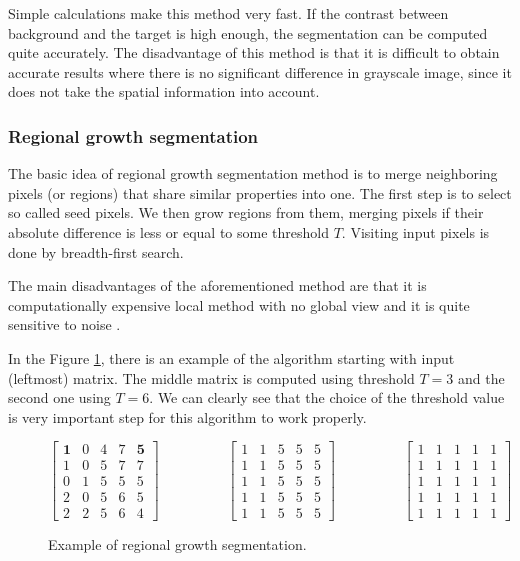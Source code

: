 Simple calculations make this method very fast. If the contrast between
background and the target is high enough, the segmentation can be computed quite
accurately. The disadvantage of this method is that it is difficult to obtain
accurate results where there is no significant difference in grayscale image, since
it does not take the spatial information into account. \cite{bib:yuheng2017image}

\subsubsection{Regional growth segmentation}
\label{sec:image_segmentation:region_based:reggrowth}

The basic idea of regional growth segmentation method is to merge neighboring
pixels (or regions) that share similar properties into one. The first step
is to select so called seed pixels. We then grow regions from them, merging pixels
if their absolute difference is less or equal to some threshold $T$.
Visiting input pixels is done by breadth-first search.

The main disadvantages of the aforementioned method are that it is computationally expensive
local method with no global view and it is quite sensitive to noise .

In the Figure \ref{img:regionalgrowthexample},
there is an example of the algorithm starting with input (leftmost) matrix. The middle
matrix is computed using threshold $T=3$ and the second one using $T=6$. We can clearly
see that the choice of the threshold value is very important step for this algorithm
to work properly. \cite{bib:yuheng2017image}

\begin{figure}[!h]
    $$\begin{bmatrix}
    \textbf{1} & 0 & 4 & 7 & \textbf{5} \\
    1 & 0 & 5 & 7 & 7 \\
    0 & 1 & 5 & 5 & 5 \\
    2 & 0 & 5 & 6 & 5 \\
    2 & 2 & 5 & 6 & 4
    \end{bmatrix}
    \hspace{2cm}
    \begin{bmatrix}
    1 & 1 & 5 & 5 & 5 \\
    1 & 1 & 5 & 5 & 5 \\
    1 & 1 & 5 & 5 & 5 \\
    1 & 1 & 5 & 5 & 5 \\
    1 & 1 & 5 & 5 & 5
    \end{bmatrix}
    \hspace{2cm}
    \begin{bmatrix}
    1 & 1 & 1 & 1 & 1 \\
    1 & 1 & 1 & 1 & 1 \\
    1 & 1 & 1 & 1 & 1 \\
    1 & 1 & 1 & 1 & 1 \\
    1 & 1 & 1 & 1 & 1
    \end{bmatrix}
    $$
    \caption[Example of regional growth segmentation]{Example of regional growth segmentation.}
    \label{img:regionalgrowthexample}
\end{figure}

